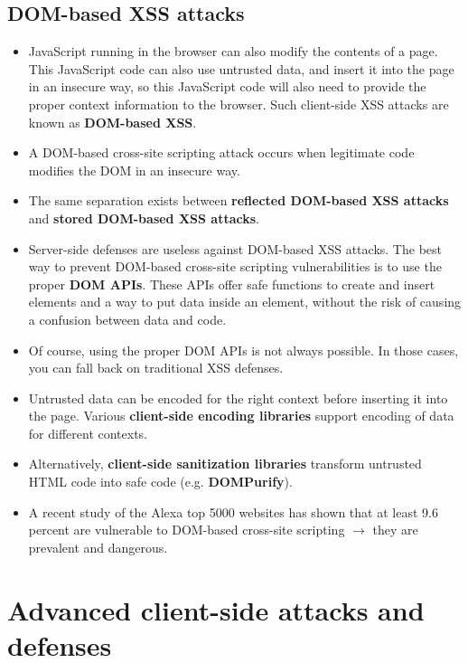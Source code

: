 \documentclass[../main.tex]{subfiles}
\begin{document}
\subsection{DOM-based XSS attacks}
\begin{itemize}
\item JavaScript running in the browser can also modify the contents of a page. This JavaScript code can also use untrusted data, and insert it into the page in an insecure way, so this JavaScript code will also need to provide the proper context information to the browser. Such client-side XSS attacks are known as \textbf{DOM-based XSS}.
\item A DOM-based cross-site scripting attack occurs when legitimate code modifies the DOM in an insecure way.
\item The same separation exists between \textbf{reflected DOM-based XSS attacks} and \textbf{stored DOM-based XSS attacks}.
\item Server-side defenses are useless against DOM-based XSS attacks. The best way to prevent DOM-based cross-site scripting vulnerabilities is to use the proper \textbf{DOM APIs}. These APIs offer safe functions to create and insert elements and a way to put data inside an element, without the risk of causing a confusion between data and code.
\item Of course, using the proper DOM APIs is not always possible. In those cases, you can fall back on traditional XSS defenses.
\item Untrusted data can be encoded for the right context before inserting it into the page. Various \textbf{client-side encoding libraries} support encoding of data for different contexts.
\item Alternatively, \textbf{client-side sanitization libraries} transform untrusted HTML code into safe code (e.g. \textbf{DOMPurify}).
\item A recent study of the Alexa top 5000 websites has shown that at least 9.6 percent are vulnerable to DOM-based cross-site scripting $\rightarrow$ they are prevalent and dangerous.
\end{itemize}

\section{Advanced client-side attacks and defenses}
\end{document}
